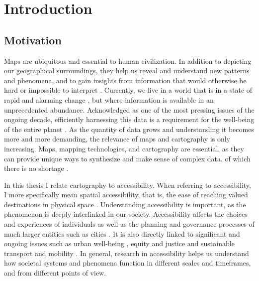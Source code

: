 \section{Introduction}



\subsection{Motivation}

Maps are ubiquitous and essential to human civilization.
In addition to depicting our geographical surroundings,
they help us reveal and understand new patterns and phenomena,
and to gain insights from information
that would otherwise be hard or impossible to interpret \parencite{mac2004}.
Currently, we live in a world that is in a state of rapid and
alarming change \parencite{un2023},
but where information is available in an unprecedented abundance.
Acknowledged as one of the most pressing issues of the ongoing decade,
efficiently harnessing this data is a requirement
for the well-being of the entire planet \parencite{un2020}.
As the quantity of data grows
and understanding it becomes more and more demanding,
the relevance of maps and cartography is only increasing.
Maps, mapping technologies, and cartography are essential,
as they can provide unique ways to synthesize and make sense of complex data,
of which there is no shortage \parencite{kra2021}.



In this thesis I relate cartography to accessibility.
When referring to accessibility,
I more specifically mean spatial accessibility, that is,
the ease of reaching valued destinations in physical space \parencite{lev2020}.
Understanding accessibility is important,
as the phenomenon is deeply interlinked in our society.
Accessibility affects the choices and experiences of individuals \parencite{kwa1998, kwa2003}
as well as the planning and governance processes
of much larger entities such as cities \parencite{cur2010, low2015}.
It is also directly linked to significant and ongoing issues such as
urban well-being \parencite{zha2011},
equity and justice \parencite{per2017, che2020}
and sustainable transport and mobility \parencite{son2017, mah2019}.
In general, research in accessibility helps us understand
how societal systems and phenomena function
in different scales and timeframes, and from different points of view.

